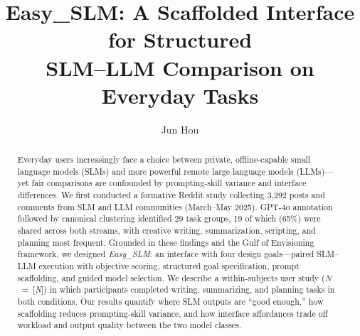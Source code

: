 \documentclass[sigconf,screen]{acmart}
\begin{document}
\title{Easy\_SLM: A Scaffolded Interface for Structured\\
       SLM--LLM Comparison on Everyday Tasks}

\author{Jun Hou}
\affiliation{%
  \institution{[Institution]}
  \country{[Country]}}

\begin{abstract}
Everyday users increasingly face a choice between private, offline-capable
small language models (SLMs) and more powerful remote large language models
(LLMs)---yet fair comparisons are confounded by prompting-skill variance and
interface differences.
We first conducted a formative Reddit study collecting 3,292 posts and
comments from SLM and LLM communities (March--May 2025).
GPT-4o annotation followed by canonical clustering identified 29 task groups,
19 of which (65\%) were shared across both streams, with creative writing,
summarization, scripting, and planning most frequent.
Grounded in these findings and the Gulf of Envisioning framework, we
designed \textit{Easy\_SLM}: an interface with four design goals---paired
SLM--LLM execution with objective scoring, structured goal specification,
prompt scaffolding, and guided model selection.
We describe a within-subjects user study ($N$~=~[\textit{N}]) in which
participants completed writing, summarizing, and planning tasks in both
conditions.
Our results quantify where SLM outputs are ``good enough,'' how scaffolding
reduces prompting-skill variance, and how interface affordances trade off
workload and output quality between the two model classes.
\end{abstract}


\maketitle







\begin{acks}
\end{acks}



\end{document}
